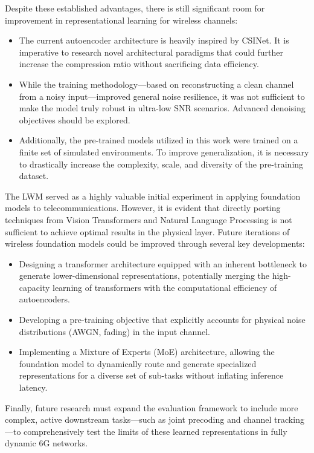 Despite these established advantages, there is still significant room for improvement in representational learning for wireless channels:

\begin{itemize}
    \item The current autoencoder architecture is heavily inspired by CSINet. It is imperative to research novel architectural paradigms that could further increase the compression ratio without sacrificing data efficiency.
    \item While the training methodology—based on reconstructing a clean channel from a noisy input—improved general noise resilience, it was not sufficient to make the model truly robust in ultra-low SNR scenarios. Advanced denoising objectives should be explored.
    \item Additionally, the pre-trained models utilized in this work were trained on a finite set of simulated environments. To improve generalization, it is necessary to drastically increase the complexity, scale, and diversity of the pre-training dataset.
\end{itemize}

The LWM served as a highly valuable initial experiment in applying foundation models to telecommunications. However, it is evident that directly porting techniques from Vision Transformers and Natural Language Processing is not sufficient to achieve optimal results in the physical layer. Future iterations of wireless foundation models could be improved through several key developments:

\begin{itemize}
    \item Designing a transformer architecture equipped with an inherent bottleneck to generate lower-dimensional representations, potentially merging the high-capacity learning of transformers with the computational efficiency of autoencoders.
    \item Developing a pre-training objective that explicitly accounts for physical noise distributions (AWGN, fading) in the input channel.
    \item Implementing a Mixture of Experts (MoE) architecture, allowing the foundation model to dynamically route and generate specialized representations for a diverse set of sub-tasks without inflating inference latency.
\end{itemize}

Finally, future research must expand the evaluation framework to include more complex, active downstream tasks—such as joint precoding and channel tracking—to comprehensively test the limits of these learned representations in fully dynamic 6G networks.